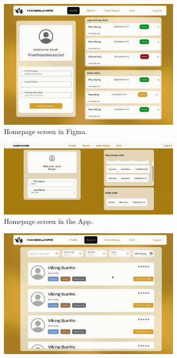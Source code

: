 \documentclass[11pt,a4paper]{article}
\begin{document}
\begin{figure}[!htb]
\centering

\begin{subfigure}[t]{0.49\textwidth}
\centering
\includegraphics[width=\textwidth]{homepage_figma}
\caption{Homepage screen in Figma.}
\end{subfigure}%
\begin{subfigure}[t]{0.49\textwidth}
\centering
\includegraphics[width=\textwidth]{homepage_front}
\caption{Homepage screen in the App.}
\end{subfigure}%
\hfill
\begin{subfigure}[t]{0.49\textwidth}
\centering
\includegraphics[width=\textwidth]{search_figma}

\end{subfigure}
\end{figure}
\end{document}
